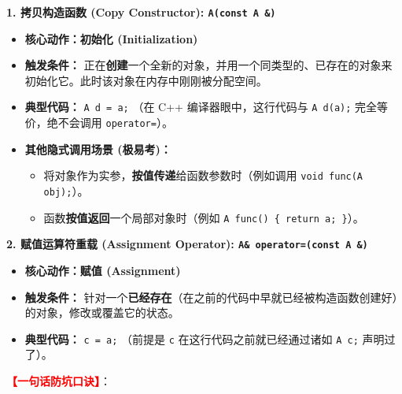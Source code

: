 \documentclass[11pt, a4paper]{article}
\begin{document}
\vspace{0.5em}
\noindent \textbf{1. 拷贝构造函数 (Copy Constructor): \texttt{A(const A \&)}}
\begin{itemize}
    \item \textbf{核心动作：初始化 (Initialization)}
    \item \textbf{触发条件：} 正在\textbf{创建}一个全新的对象，并用一个同类型的、已存在的对象来初始化它。此时该对象在内存中刚刚被分配空间。
    \item \textbf{典型代码：} \texttt{A d = a;} （在 C++ 编译器眼中，这行代码与 \texttt{A d(a);} 完全等价，绝不会调用 \texttt{operator=}）。
    \item \textbf{其他隐式调用场景 (极易考)：}
    \begin{itemize}
        \item 将对象作为实参，\textbf{按值传递}给函数参数时（例如调用 \texttt{void func(A obj);}）。
        \item 函数\textbf{按值返回}一个局部对象时（例如 \texttt{A func() \{ return a; \}}）。
    \end{itemize}
\end{itemize}

\vspace{0.5em}
\noindent \textbf{2. 赋值运算符重载 (Assignment Operator): \texttt{A\& operator=(const A \&)}}
\begin{itemize}
    \item \textbf{核心动作：赋值 (Assignment)}
    \item \textbf{触发条件：} 针对一个\textbf{已经存在}（在之前的代码中早就已经被构造函数创建好）的对象，修改或覆盖它的状态。
    \item \textbf{典型代码：} \texttt{c = a;} （前提是 \texttt{c} 在这行代码之前就已经通过诸如 \texttt{A c;} 声明过了）。
\end{itemize}

\vspace{1em} %
\noindent \textbf{\textcolor{red}{【一句话防坑口诀】}}：
\begin{center}
\end{center}

\end{document}
